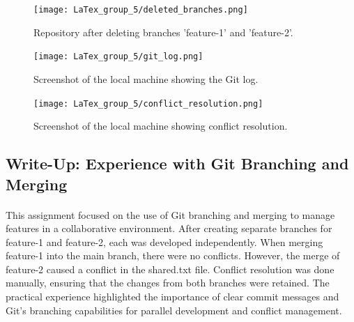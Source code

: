 \documentclass[a4paper,12pt]{article}
\begin{document}
\begin{figure}[h!]
    \centering
    \texttt{[image: LaTex\_group\_5/deleted\_branches.png]}
       \hspace{4 cm}
    \caption{Repository after deleting branches 'feature-1' and 'feature-2'.}
    \label{fig:enter-label}
\end{figure}
\hspace{6 cm}
\begin{figure}[h!]
    \centering
    \texttt{[image: LaTex\_group\_5/git\_log.png]} %
    \hspace{4 cm}
    \caption{Screenshot of the local machine showing the Git log.}
\end{figure}
\hspace{6 cm}
\begin{figure}[h!]
    \centering
    \texttt{[image: LaTex\_group\_5/conflict\_resolution.png]} %
       \hspace{4 cm}
    \caption{Screenshot of the local machine showing conflict resolution.}
\end{figure}
\newpage
{}
\vspace{0.5 cm}
\subsection*{\Huge{Write-Up: Experience with Git Branching and Merging}}
\hspace{1 cm}
\paragraph {\noindent}{This assignment focused on the use of Git branching and merging to manage features in a collaborative environment. After creating separate branches for feature-1 and feature-2, each was developed independently.
When merging feature-1 into the main branch, there were no conflicts. However, the merge of feature-2 caused a conflict in the shared.txt file. Conflict resolution was done manually, ensuring that the changes from both branches were retained.
The practical experience highlighted the importance of clear commit messages and Git’s branching capabilities for parallel development and conflict management.}
\end{document}

